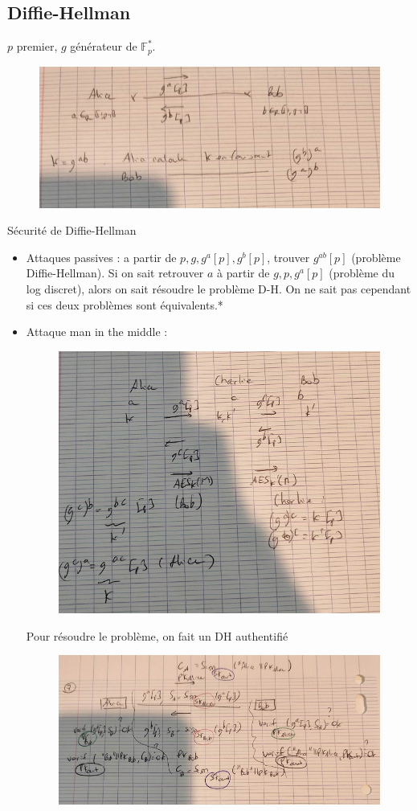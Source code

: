         \subsection{Diffie-Hellman}
            $p$ premier, $g$ générateur de $\mathbb{F}_p^*$.
            \begin{figure}[H]
                \centering
                \includegraphics[width=.5\textwidth]{pictures/13}
            \end{figure} \noindent 
            Sécurité de Diffie-Hellman
            \begin{itemize}
                \item Attaques passives : a partir de $p, g, g^a [p], g^b [p]$, trouver $g^{ab} [p]$ (problème Diffie-Hellman). Si on sait retrouver $a$ à partir de $g, p, g^a [p]$ (problème du log discret), alors on sait résoudre le problème D-H. On ne sait pas cependant si ces deux problèmes sont équivalents.*
                \item Attaque man in the middle :
                \begin{figure}[H]
                    \centering
                    \includegraphics[width=.5\textwidth]{pictures/14}
                \end{figure} \noindent
                Pour résoudre le problème, on fait un DH authentifié
                \begin{figure}[H]
                    \centering
                    \includegraphics[width=.5\textwidth]{pictures/15}
                \end{figure} \noindent
            \end{itemize}

